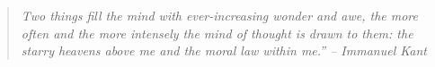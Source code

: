 
\begin{quote}
\em{Two things fill the mind with ever-increasing wonder and awe,
the more often and the more intensely the mind of thought is drawn to
them: the starry heavens above me and the moral law within me.'' -- Immanuel Kant}
\end{quote}


